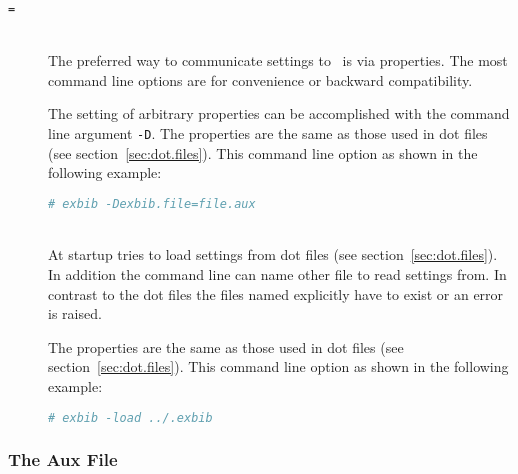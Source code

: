 \begin{description}
\item[\texttt{=}]\ \\
  
  The preferred way to communicate settings to \ExBib\ is via
  properties. The most command line options are for convenience or
  backward compatibility.
  
  The setting of arbitrary properties can be accomplished with the
  command line argument \texttt{-D}. The properties are the same as
  those used in dot files (see
  section~\ref{sec:dot.files}). This command line option as shown in
  the following example:

\begin{lstlisting}[language=sh]
# exbib -Dexbib.file=file.aux
\end{lstlisting}

\item[ ]\ \\
  
  At startup  tries to load settings from dot
  files (see section~\ref{sec:dot.files}). In addition
  the command line can name other file to read settings from. In
  contrast to the dot files the files named explicitly have to exist
  or an error is raised.
  
  The properties are the same as those used in dot files (see section~\ref{sec:dot.files}). This command line option
  as shown in the following example:

\begin{lstlisting}[language=sh]
# exbib -load ../.exbib
\end{lstlisting}

\end{description}


\subsubsection{The Aux File}


